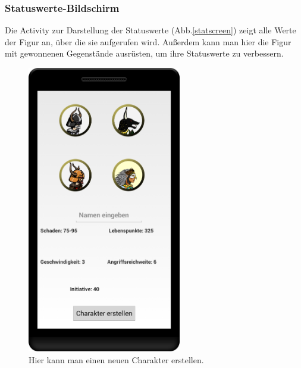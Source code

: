 \documentclass[extern,palatino]{cgBA}
\begin{document}
\subsubsection{Statuswerte-Bildschirm}
Die Activity zur Darstellung der Statuswerte (Abb.\ref{statscreen}) zeigt alle Werte der Figur an, über die sie aufgerufen wird. Außerdem kann man hier die Figur mit gewonnenen Gegenstände ausrüsten, um ihre Statuswerte zu verbessern.
\newpage
\begin{figure}[H] 
	\centering
	\includegraphics[width=0.6\textwidth]{createcharscreen.png}
	\caption{Hier kann man einen neuen Charakter erstellen.}
	\label{createcharscreen}
\end{figure} 
\end{document}

